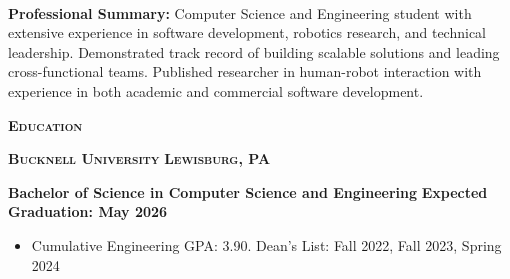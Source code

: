 \documentclass{article}
\newlength{\sectspaceabove}
\newlength{\sectspacebelow}
\newcommand{\textscbf}[1]{\textbf{\textsc{#1}}}
\newcommand{\resumesection}[1]{%
    \vspace{\sectspaceabove}%
    \begin{center}
        \textscbf{#1}
    \end{center}%
    \vspace{\sectspacebelow}%
}
\begin{document}
\begin{center}
    {\large \textscbf{\personalName}}
\end{center}

\vspace{0.5em}

\noindent
\begin{minipage}[t]{0.33\textwidth}
    \raggedright
    \ifx\personalSchoolAddressLineOne\empty\else
        \personalSchoolAddressLineOne\\%
        \personalSchoolAddressLineTwo\\%
        \personalSchoolAddressLineThree%
    \fi
\end{minipage}%
\hfill%
\begin{minipage}[t]{0.33\textwidth} 
    \centering
    \href{mailto:\personalEmail}{\personalEmail}%
    \ifx\personalSchoolEmail\empty\else
        \\\href{mailto:\personalSchoolEmail}{\personalSchoolEmail}%
    \fi
    \ifx\personalPhone\empty\else
        \\\personalPhone%
    \fi
    \\\href{https://\personalWebsite}{\personalWebsite}%
\end{minipage}%
\hfill%
\begin{minipage}[t]{0.33\textwidth}
    \raggedleft
    \ifx\personalHomeAddressLineOne\empty\else
        \personalHomeAddressLineOne\\%
        \personalHomeAddressLineTwo%
    \fi
\end{minipage}

\vspace{1em}

\noindent
\begin{minipage}{\textwidth}
    \textbf{Professional Summary:} Computer Science and Engineering student with extensive experience in software development, robotics research, and technical leadership. 
    Demonstrated track record of building scalable solutions and leading cross-functional teams. 
    Published researcher in human-robot interaction with experience in both academic and commercial software development.
\end{minipage}

\resumesection{Education}

\textscbf{Bucknell University} \hfill \textscbf{Lewisburg, PA}

\textbf{Bachelor of Science in Computer Science and Engineering} \hfill \textbf{Expected Graduation: May 2026}
\begin{itemize}[noitemsep,topsep=2pt]
    \item Cumulative Engineering GPA: 3.90. Dean's List: Fall 2022, Fall 2023, Spring 2024
\end{itemize}
\end{document}

